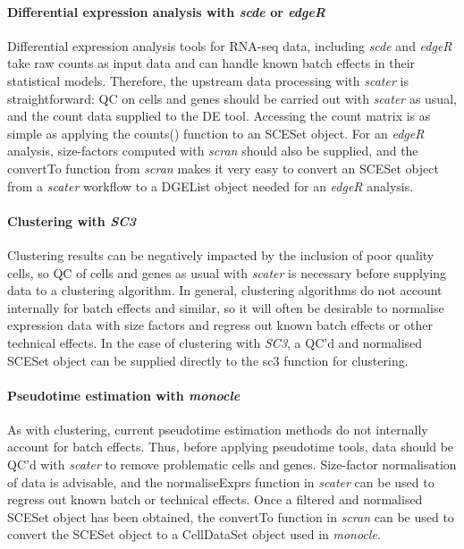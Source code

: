 \documentclass{revtex4}
\begin{document}
\paragraph{Differential expression analysis with \emph{scde} or \emph{edgeR}} Differential expression analysis tools for RNA-seq data, including \emph{scde} and \emph{edgeR} take raw counts as input data and can handle known batch effects in their statistical models. Therefore, the upstream data processing with \emph{scater} is straightforward: QC on cells and genes should be carried out with \emph{scater} as usual, and the count data supplied to the DE tool. Accessing the count matrix is as simple as applying the counts() function to an SCESet object. For an \emph{edgeR} analysis, size-factors computed with \emph{scran} should also be supplied, and the convertTo function from \emph{scran} makes it very easy to convert an SCESet object from a \emph{scater} workflow to a DGEList object needed for an \emph{edgeR} analysis.

\paragraph{Clustering with \emph{SC3}} Clustering results can be negatively impacted by the inclusion of poor quality cells, so QC of cells and genes as usual with \emph{scater} is necessary before supplying data to a clustering algorithm. In general, clustering algorithms do not account internally for batch effects and similar, so it will often be desirable to normalise expression data with size factors and regress out known batch effects or other technical effects. In the case of clustering with \emph{SC3}, a QC'd and normalised SCESet object can be supplied directly to the sc3 function for clustering.

\paragraph{Pseudotime estimation with \emph{monocle}} As with clustering, current pseudotime estimation methods do not internally account for batch effects. Thus, before applying pseudotime tools, data should be QC'd with \emph{scater} to remove problematic cells and genes. Size-factor normalisation of data is advisable, and the normaliseExprs function in \emph{scater} can be used to regress out known batch or technical effects. Once a filtered and normalised SCESet object has been obtained, the convertTo function in \emph{scran} can be used to convert the SCESet object to a CellDataSet object used in \emph{monocle}.
\end{document}
